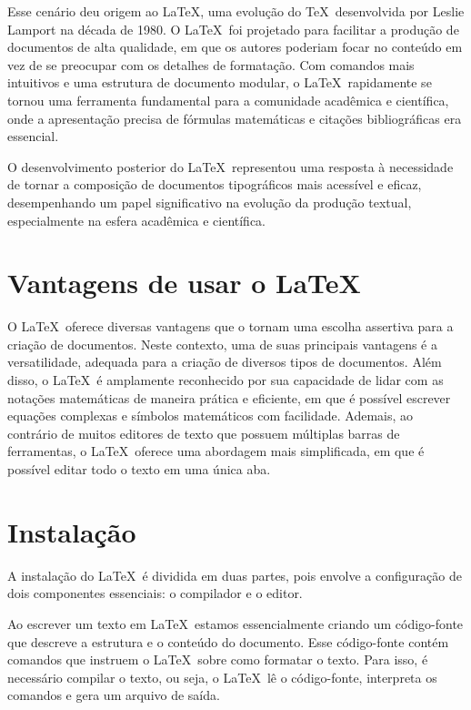 \noindent Esse cenário deu origem ao \LaTeX, uma evolução do \TeX\ desenvolvida por Leslie Lamport na década de 1980. O \LaTeX\ foi projetado para facilitar a produção de documentos de alta qualidade, em que os autores poderiam focar no conteúdo em vez de se preocupar com os detalhes de formatação. Com comandos mais intuitivos e uma estrutura de documento modular, o \LaTeX\ rapidamente se tornou uma ferramenta fundamental para a comunidade acadêmica e científica, onde a apresentação precisa de fórmulas matemáticas e citações bibliográficas era essencial.

\noindent O desenvolvimento posterior do \LaTeX\ representou uma resposta à necessidade de tornar a composição de documentos tipográficos mais acessível e eficaz, desempenhando um papel significativo na evolução da produção textual, especialmente na esfera acadêmica e científica.


\section{Vantagens de usar o LaTeX}
\noindent O \LaTeX \ oferece diversas vantagens que o tornam uma escolha assertiva para a cria\c c\~ao de documentos. Neste contexto, uma de suas principais vantagens \'e a versatilidade, adequada para a cria\c c\~ao de diversos tipos de documentos. Al\'em disso, o \LaTeX \ \'e amplamente reconhecido por sua capacidade de lidar com as nota\c c\~oes matem\'aticas de maneira pr\'atica e eficiente, em que \'e poss\'ivel escrever equa\c c\~oes complexas e s\'imbolos matem\'aticos com facilidade. Ademais, ao contr\'ario de muitos editores de texto que possuem m\'ultiplas barras de ferramentas, o \LaTeX \ oferece uma abordagem mais simplificada, em que \'e possível editar todo o texto em uma \'unica aba.
\section{Instalação}
\label{sec:2}

\noindent A instala\c c\~ao do \LaTeX\ \'e dividida em duas partes, pois envolve a configura\c c\~ao de dois componentes essenciais: o compilador e o editor. 

\noindent Ao escrever um texto em \LaTeX\, estamos essencialmente criando um c\'odigo-fonte que descreve a estrutura e o conte\'udo do documento. Esse c\'odigo-fonte cont\'em comandos que instruem o \LaTeX\ sobre como formatar o texto. Para isso, \'e necess\'ario compilar o texto, ou seja, o \LaTeX\ l\^e o c\'odigo-fonte, interpreta os comandos e gera um arquivo de sa\'ida.

